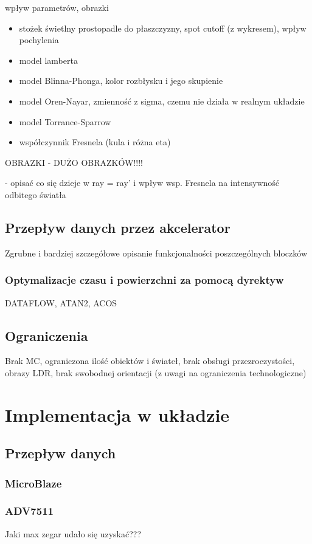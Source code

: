 \begin{enumerate}
wpływ parametrów, obrazki
\begin{itemize}
\item stożek świetlny prostopadle do płaszczyzny, spot cutoff (z wykresem), wpływ pochylenia
\item model lamberta
\item model Blinna-Phonga, kolor rozbłysku i jego skupienie
\item model Oren-Nayar, zmienność z sigma, czemu nie działa w realnym układzie
\item model Torrance-Sparrow
\item współczynnik Fresnela (kula i różna eta)
\end{itemize}
{\color{red}OBRAZKI - DUŻO OBRAZKÓW!!!!}


- opisać co się dzieje w ray = ray' i wpływ wsp. Fresnela na intensywność odbitego światła

\end{enumerate}

\subsection{Przepływ danych przez akcelerator}
Zgrubne i bardziej szczegółowe opisanie funkcjonalności poszczególnych bloczków
\subsubsection{Optymalizacje czasu i powierzchni za pomocą dyrektyw}
DATAFLOW, ATAN2, ACOS

\subsection{Ograniczenia}
Brak MC, ograniczona ilość obiektów i świateł, brak obsługi przezroczystości, obrazy LDR, brak swobodnej orientacji (z uwagi na ograniczenia technologiczne)

\section{Implementacja w układzie}
\subsection{Przepływ danych}
\subsubsection{MicroBlaze}
\subsubsection{ADV7511}
Jaki max zegar udało się uzyskać???

